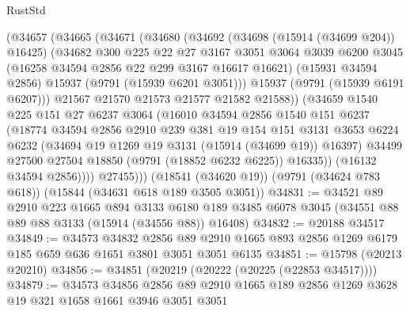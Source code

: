 \begin{lexlean}{RustStd}
\begin{coremodule}
          (@34657
            (@34665
              (@34671
                (@34680
                  (@34692
                    (@34698 (@15914 (@34699 @204)) @16425)
                    (@34682
                      @300
                      @225
                      @22
                      @27
                      @3167
                      @3051
                      @3064
                      @3039
                      @6200
                      @3045
                      (@16258 @34594 @2856 @22 @299 @3167 @16617 @16621)
                      (@15931 @34594 @2856)
                      @15937
                      (@9791 (@15939 @6201 @3051)))
                    @15937
                    (@9791 (@15939 @6191 @6207)))
                  @21567
                  @21570
                  @21573
                  @21577
                  @21582
                  @21588))
              (@34659
                @1540
                @225
                @151
                @27
                @6237
                @3064
                (@16010
                  @34594
                  @2856
                  @1540
                  @151
                  @6237
                  (@18774
                    @34594
                    @2856
                    @2910
                    @239
                    @381
                    @19
                    @154
                    @151
                    @3131
                    @3653
                    @6224
                    @6232
                    (@34694 @19 @1269 @19 @3131 (@15914 (@34699 @19)) @16397)
                    @34499
                    @27500
                    @27504
                    @18850
                    (@9791 (@18852 @6232 @6225))
                    @16335))
                (@16132 @34594 @2856))))
          @27455)))
    (@18541 (@34620 @19))
    (@9791 (@34624 @783 @618))
    (@15844 (@34631 @618 @189 @3505 @3051))
@34831 := @34521
    @89
    @2910
    @223
    @1665
    @894
    @3133
    @6180
    @189
    @3485
    @6078
    @3045
    (@34551 @88 @89 @88 @3133 (@15914 (@34556 @88)) @16408)
@34832 := @20188 @34517
@34849 := @34573
    @34832
    @2856
    @89
    @2910
    @1665
    @893
    @2856
    @1269
    @6179
    @185
    @659
    @636
    @1651
    @3801
    @3051
    @3051
    @6135
@34851 := @15798 (@20213 @20210)
@34856 := @34851 (@20219 (@20222 (@20225 (@22853 @34517))))
@34879 := @34573
    @34856
    @2856
    @89
    @2910
    @1665
    @189
    @2856
    @1269
    @3628
    @19
    @321
    @1658
    @1661
    @3946
    @3051
    @3051

\end{coremodule}
\end{lexlean}
